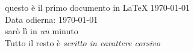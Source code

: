 \documentclass[12pt,a4paper]{article}
\begin{document}
	
questo è il primo documento in \LaTeX{} \today \\
Data odierna: \today \\ sarò lì in \emph{un} minuto \\
Tutto il resto è \itshape{scritto in carattere corsivo}
\end{document}
